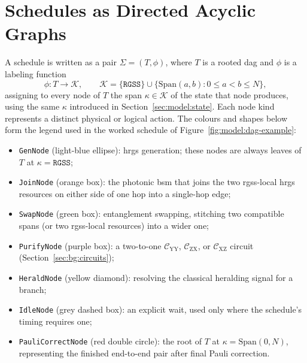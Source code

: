 
\section{Schedules as Directed Acyclic Graphs}
\label{sec:model:dag}



A schedule is written as a pair $\Sigma = (T, \phi)$, where $T$ is a rooted \Gls{dag} and $\phi$ is a labeling function
\[
    \phi: T \to \mathcal{K}, \qquad
    \mathcal{K} = \{\mathtt{RGSS}\} \cup \{\mathrm{Span}(a,b) : 0 \le a < b \le N\},
\]
assigning to every node of $T$ the span $\kappa \in \mathcal{K}$ of the state that node produces, using the same $\kappa$ introduced in Section~\ref{sec:model:state}. Each node kind represents a distinct physical or logical action. The colours and shapes below form the legend used in the worked schedule of Figure~\ref{fig:model:dag-example}:
\begin{itemize}
    \item {}\enspace\texttt{GenNode} (light-blue ellipse): \Gls{hrgs} generation; these nodes are always leaves of $T$ at $\kappa=\mathtt{RGSS}$;
    \item {}\enspace\texttt{JoinNode} (orange box): the photonic \Gls{bsm} that joins the two \Gls{rgss}-local \Gls{hrgs} resources on either side of one hop into a single-hop edge;
    \item {}\enspace\texttt{SwapNode} (green box): entanglement swapping, stitching two compatible spans (or two \Gls{rgss}-local resources) into a wider one;
    \item {}\enspace\texttt{PurifyNode} (purple box): a two-to-one $\mathcal C_\mathrm{YY}$, $\mathcal C_\mathrm{ZX}$, or $\mathcal C_\mathrm{XZ}$ circuit (Section~\ref{sec:bg:circuits});
    \item {}\enspace\texttt{HeraldNode} (yellow diamond): resolving the classical heralding signal for a branch;
    \item {}\enspace\texttt{IdleNode} (grey dashed box): an explicit wait, used only where the schedule's timing requires one;
    \item {}\enspace\texttt{PauliCorrectNode} (red double circle): the root of $T$ at $\kappa=\mathrm{Span}(0,N)$, representing the finished end-to-end pair after final Pauli correction.
\end{itemize}

